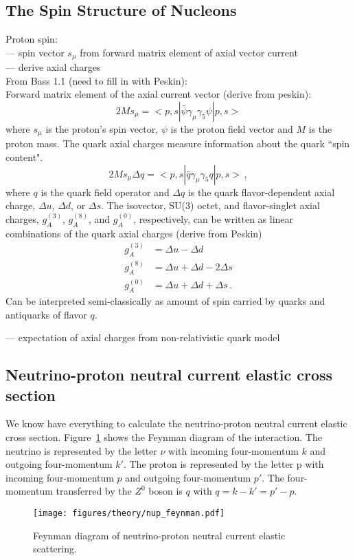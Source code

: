 \subsection{The Spin Structure of Nucleons} \label{sec:nuctheory}
  Proton spin: \\
  --- spin vector $s_{\mu}$ from forward matrix element of axial vector current \\
  --- derive axial charges \\
  From Bass 1.1 (need to fill in with Peskin): \\
  Forward matrix element of the axial current vector (derive from peskin):
  \[
      2Ms_{\mu} = <p,s|\bar{\psi}\gamma_{\mu} \gamma_{5} \psi|p,s>
  \]
  where $s_{\mu}$ is the proton's spin vector, $\psi$ is the proton field
  vector and $M$ is the proton mass. The quark axial charges measure
  information about the quark ``spin content".
  \[
    2Ms_{\mu}\Delta q = <p,s| \bar{q}\gamma_{\mu}\gamma_{5}q|p,s> \,,
  \]
  where $q$ is the quark field operator and $\Delta q$ is the quark
  flavor-dependent axial charge, $\Delta u$, $\Delta d$, or $\Delta s$. The
  isovector, SU(3) octet, and flavor-singlet axial charges, $g_A^{(3)}$,
  $g_A^{(8)}$, and $g_A^{(0)}$, respectively, can be written as linear
  combinations of the quark axial charges (derive from Peskin)
  \begin{align}
      g_A^{(3)} &= \Delta u - \Delta d \\
      g_A^{(8)} &= \Delta u + \Delta d - 2\Delta s \\
      g_A^{(0)} &= \Delta u + \Delta d + \Delta s \,.
  \end{align}
  Can be interpreted semi-classically as amount of spin carried by quarks and
  antiquarks of flavor $q$.

  --- expectation of axial charges from non-relativistic quark model


\subsection{Neutrino-proton neutral current elastic cross section}\label{sec:probe}

  We know have everything to calculate the neutrino-proton neutral current
  elastic cross section. Figure~\ref{fig:feynmannup} shows the Feynman diagram
  of the interaction. The neutrino is represented by the letter $\nu$ with
  incoming four-momentum $k$ and outgoing four-momentum $k'$. The proton is
  represented by the letter p with incoming four-momentum $p$ and outgoing
  four-momentum $p'$. The four-momentum transferred by the $Z^0$ boson is $q$
  with $q = k-k' = p' - p$.
  \begin{figure}[ht]
    \centering
    \texttt{[image: figures/theory/nup\_feynman.pdf]}
    \caption{Feynman diagram of neutrino-proton neutral current elastic
    scattering.}
    \label{fig:feynmannup}
  \end{figure}

